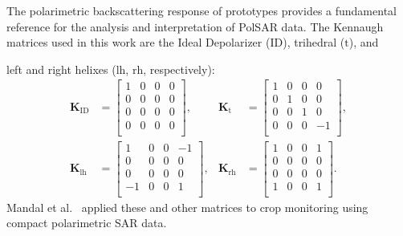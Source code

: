 \documentclass[journal]{IEEEtran}
\begin{document}
The polarimetric backscattering response of prototypes provides a fundamental reference for the analysis and interpretation of PolSAR data.
The Kennaugh matrices used in this work are the 
Ideal Depolarizer (${\text{ID}}$),
{trihedral} ($\text{t}$),
and {left and right helixes (${\text{lh}}$, ${\text{rh}}$, respectively):
\begin{align*}
\bm{K}_{\text{ID}} & =
\begin{bmatrix}
1 & 0 & 0 & 0\\
0 & 0 & 0 & 0\\
0 & 0 & 0 & 0\\
0 & 0 & 0 & 0\\
\end{bmatrix},
&
\bm K_{\text{t}} &=
\begin{bmatrix}
1 & 0 & 0 & 0\\
0 & 1 & 0 & 0\\
0 & 0 & 1 & 0\\
0 & 0 & 0 & -1\\
\end{bmatrix}, \\
\bm K_{\text{lh}} &= 
\begin{bmatrix}
1 & 0 & 0 & -1 \\
0 & 0 & 0 & 0 \\
0 & 0 & 0 & 0 \\
-1 & 0 & 0 & 1\\
\end{bmatrix}
,
& \bm K_{\text{rh}} &=
\begin{bmatrix}
1 & 0 & 0 & 1 \\
0 & 0 & 0 & 0 \\
0 & 0 & 0 & 0 \\
1 & 0 & 0 & 1\\
\end{bmatrix}.
\end{align*}
Mandal et al.~\cite{ARadarVegetationIndexforCropMonitoringUsingCompactPolarimetricSARData} applied these and other matrices to crop monitoring using compact polarimetric SAR data.

}
\end{document}
